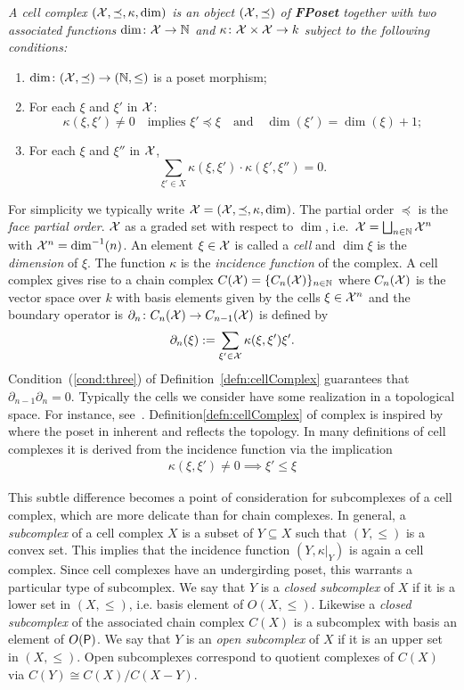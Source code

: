 \begin{defn}
\label{defn:cellComplex}
{\em
A {\em cell complex} $({\mathcal X},\preceq,\kappa,\dim)$ is an object $({\mathcal X},\preceq)$ of {\bf FPoset} together with two associated functions $\dim\colon {\mathcal X}\to {\mathbb{N}}$ and $\kappa\colon {\mathcal X}\times {\mathcal X}\to k$ subject to the following conditions:
\begin{enumerate}
\item $\dim\colon({\mathcal X},\preceq)\to ({\mathbb{N}},\leq)$ is a poset morphism;
\item  For each $\xi$ and $\xi'$ in ${\mathcal X}$:
\[
\kappa(\xi,\xi')\neq 0\quad\text{implies } \xi'\preceq \xi \quad\text{and}\quad \dim(\xi') = \dim(\xi)+1;
\]
\item\label{cond:three} For each $\xi$ and $\xi''$ in ${\mathcal X}$,
\[
\sum_{\xi'\in X} \kappa(\xi,\xi')\cdot \kappa(\xi',\xi'')=0.
\]
\end{enumerate}
}
\end{defn}

For simplicity we typically write ${\mathcal X}=({\mathcal X},\preceq,\kappa,\dim)$.  
The partial order $\preceq$ is the {\em face partial order}.
${\mathcal X}$ as a graded set with respect to $\dim$, i.e.\ ${\mathcal X} = \bigsqcup_{n\in {\mathbb{N}}} {\mathcal X}^n$ with ${\mathcal X}^n = \dim^{-1}(n)$.  
An element $\xi\in {\mathcal X}$ is called a {\em cell} and $\dim \xi$ is the {\em dimension} of $\xi$. 
The function $\kappa$ is the {\em incidence function} of the complex.    A cell complex gives rise to a chain complex $C({\mathcal X}) = \{C_n({\mathcal X})\}_{n\in{\mathbb{N}}}$ where $C_n({\mathcal X})$ is the vector space over $k$ with basis elements given by the cells $\xi\in {\mathcal X}^n$ and the boundary operator is $\partial_n\colon C_n({\mathcal X}) \to C_{n-1}({\mathcal X})$ is defined by
\[
\partial_n( \xi) := \sum_{\xi' \in {\mathcal X}} \kappa(\xi, \xi')\xi'.
\]
Condition~(\ref{cond:three}) of Definition~\ref{defn:cellComplex} guarantees that $\partial_{n-1}\partial_n = 0$.  Typically the cells we consider have some realization in a topological space.  For instance, see~\cite{braids}.  Definition\ref{defn:cellComplex} of complex is inspired by~\cite{lefschetz} where the poset in inherent and reflects the topology.  In many definitions of cell complexes it is derived from the incidence function via the implication
\begin{align}\label{eqn:poset}
\kappa (\xi,\xi')\neq 0 \implies \xi'\leq \xi
\end{align}

This subtle difference becomes a point of consideration for subcomplexes of a cell complex, which are more delicate than for chain complexes.  In general, a {\em subcomplex} of a cell complex $X$ is a subset of $Y\subseteq X$ such that $(Y,\leq)$ is a convex set.  This implies that the incidence function $(Y,\kappa|_Y)$ is again a cell complex. Since cell complexes have an undergirding poset, this warrants a particular type of subcomplex.  We say that $Y$ is a {\em closed subcomplex} of $X$ if it is a lower set in $(X,\leq)$, i.e. basis element of $O(X,\leq)$.   Likewise a {\em closed subcomplex} of the associated chain complex $C(X)$ is a subcomplex with basis an element of $O({\mathsf P})$.  We say that $Y$ is an {\em open subcomplex} of $X$ if it is an upper set in $(X,\leq)$.  Open subcomplexes correspond to quotient complexes of $C(X)$ via $C(Y)\cong C(X)/C(X-Y)$.


